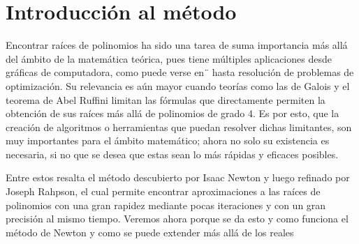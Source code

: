 \section{Introducción al método}

Encontrar raíces de polinomios ha sido una tarea de suma importancia más allá del ámbito de la matemática teórica, pues tiene múltiples aplicaciones desde gráficas de computadora, como puede verse en¨\cite{3b1b} hasta resolución de problemas de optimización. Su relevancia es aún mayor cuando teorías como las de Galois y el teorema de Abel Ruffini limitan las fórmulas que directamente permiten la obtención de sus raíces \cite{badger} más allá de polinomios de grado 4.
Es por esto, que la creación de algoritmos o herramientas que puedan resolver dichas limitantes, son muy importantes para el ámbito matemático; ahora no solo su existencia es necesaria, si no que se desea que estas sean lo más rápidas y eficaces posibles. 

Entre estos resalta el método descubierto por Isaac Newton y luego refinado por Joseph Rahpson, el cual permite encontrar aproximaciones a las raíces de polinomios con una gran rapidez mediante pocas iteraciones y con un gran precisión al mismo tiempo. Veremos ahora porque se da esto y como funciona el método de Newton y como se puede extender más allá de los reales
